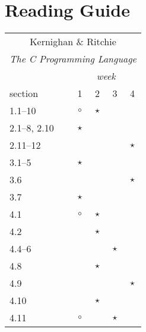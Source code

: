 \documentclass[a4paper]{article}
\begin{document}
\section{Reading Guide}

\begin{table}
  \footnotesize
  \centering
  \begin{tabular}{|l|c|c|c|c|}
    \hline
    \multicolumn{5}{|c|}{Kernighan \& Ritchie} \\
    \multicolumn{5}{|c|}{\emph{The C Programming Language}} \\
    \hline
                       & \multicolumn{4}{|c|}{\emph{week}} \\
    section            & 1       & 2       & 3       & 4 \\
    \hline
    1.1--10            & $\circ$ & $\star$ &         & \\
    \hline
    2.1--8, 2.10       & $\star$ &         &         & \\
    2.11--12           &         &         &         & $\star$ \\
    \hline
    3.1--5             & $\star$ &         &         & \\
    3.6                &         &         &         & $\star$ \\
    3.7                & $\star$ &         &         & \\
    \hline
    4.1                & $\circ$ & $\star$ &         & \\
    4.2                &         & $\star$ &         & \\
    4.4--6             &         &         & $\star$ & \\
    4.8                &         & $\star$ &         & \\
    4.9                &         &         &         & $\star$ \\
    4.10               &         & $\star$ &         & \\
    4.11               & $\circ$ &         & $\star$ & \\
    \hline

\end{tabular}
\end{table}
\end{document}
